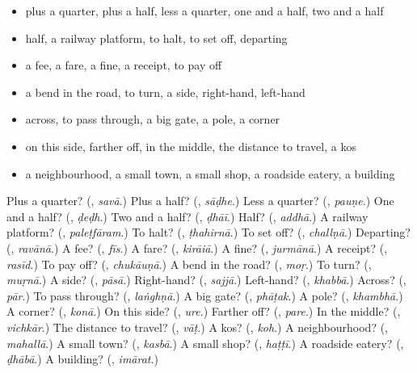 \begin{itemize}
\raggedright
  \item plus a quarter, plus a half, less a quarter, one and a half, two and a half
  \item half, a railway platform, to halt, to set off, departing
  \item a fee, a fare, a fine, a receipt, to pay off
  \item a bend in the road, to turn, a side, right-hand, left-hand
  \item across, to pass through, a big gate, a pole, a corner
  \item on this side, farther off, in the middle, the distance to travel, a kos
  \item a neighbourhood, a small town, a small shop, a roadside eatery, a building
\end{itemize}

\begin{tcolorbox}[breakable,colback=teal!4,colframe=teal!35!black,title={Before you move on}]
Plus a quarter? (\textbf{}, \emph{savā}.) Plus a half? (\textbf{}, \emph{sāḍhe}.) Less a quarter? (\textbf{}, \emph{pauṇe}.) One and a half? (\textbf{}, \emph{ḍeḍh}.) Two and a half? (\textbf{}, \emph{ḍhāī}.) Half? (\textbf{}, \emph{addhā}.) A railway platform? (\textbf{}, \emph{paleṭfāram}.) To halt? (\textbf{}, \emph{ṭhahirnā}.) To set off? (\textbf{}, \emph{challṇā}.) Departing? (\textbf{}, \emph{ravānā}.) A fee? (\textbf{}, \emph{fīs}.) A fare? (\textbf{}, \emph{kirāiā}.) A fine? (\textbf{}, \emph{jurmānā}.) A receipt? (\textbf{}, \emph{rasīd}.) To pay off? (\textbf{}, \emph{chukāuṇā}.) A bend in the road? (\textbf{}, \emph{moṛ}.) To turn? (\textbf{}, \emph{muṛnā}.) A side? (\textbf{}, \emph{pāsā}.) Right-hand? (\textbf{}, \emph{sajjā}.) Left-hand? (\textbf{}, \emph{khabbā}.) Across? (\textbf{}, \emph{pār}.) To pass through? (\textbf{}, \emph{laṅghṇā}.) A big gate? (\textbf{}, \emph{phāṭak}.) A pole? (\textbf{}, \emph{khambhā}.) A corner? (\textbf{}, \emph{konā}.) On this side? (\textbf{}, \emph{ure}.) Farther off? (\textbf{}, \emph{pare}.) In the middle? (\textbf{}, \emph{vichkār}.) The distance to travel? (\textbf{}, \emph{vāṭ}.) A kos? (\textbf{}, \emph{koh}.) A neighbourhood? (\textbf{}, \emph{mahallā}.) A small town? (\textbf{}, \emph{kasbā}.) A small shop? (\textbf{}, \emph{haṭṭī}.) A roadside eatery? (\textbf{}, \emph{ḍhābā}.) A building? (\textbf{}, \emph{imārat}.)
\end{tcolorbox}
